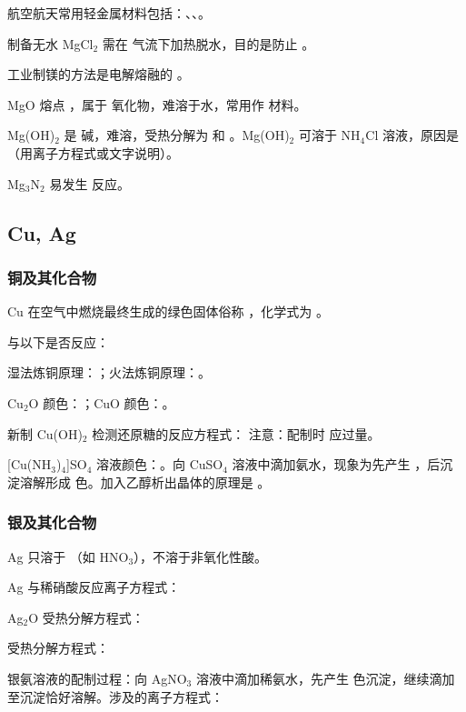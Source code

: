 航空航天常用轻金属材料包括：\sbl 、\sbl 、\sbl 。

制备无水 MgCl$_2$ 需在 \sbl 气流下加热脱水，目的是防止 \sbl 。

工业制镁的方法是电解熔融的 \sbl 。

MgO 熔点 \sbl ，属于 \sbl 氧化物，难溶于水，常用作 \sbl 材料。

Mg(OH)$_2$ 是 \sbl 碱，难溶，受热分解为 \sbl 和 \sbl 。Mg(OH)$_2$ 可溶于 NH$_4$Cl 溶液，原因是 \sbl （用离子方程式或文字说明）。

Mg$_3$N$_2$ 易发生 \sbl 反应。

\subsection{Cu, Ag}

\subsubsection{铜及其化合物}

Cu 在空气中燃烧最终生成的绿色固体俗称 \sbl ，化学式为 \sbl 。

与以下是否反应：





湿法炼铜原理：\sbl ；火法炼铜原理：\sbl 。

Cu$_2$O 颜色：\sbl ；CuO 颜色：\sbl 。

新制 Cu(OH)$_2$ 检测还原糖的反应方程式：\lbl
注意：配制时 \sbl 应过量。

[Cu(NH$_3$)$_4$]SO$_4$ 溶液颜色：\sbl 。向 CuSO$_4$ 溶液中滴加氨水，现象为先产生 \sbl ，后沉淀溶解形成 \sbl 色\mbl 。加入乙醇析出晶体的原理是 \sbl 。

\subsubsection{银及其化合物}
Ag 只溶于 \mbl （如 HNO$_3$），不溶于非氧化性酸。

Ag 与稀硝酸反应离子方程式：\lbl

Ag$_2$O 受热分解方程式：\lbl

 受热分解方程式：\lbl

银氨溶液的配制过程：向 AgNO$_3$ 溶液中滴加稀氨水，先产生 \sbl 色沉淀，继续滴加至沉淀恰好溶解。涉及的离子方程式：

